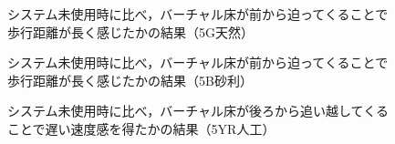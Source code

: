 \begin{figure}[H]
    \centering
    \caption{システム未使用時に比べ，バーチャル床が前から迫ってくることで歩行距離が長く感じたかの結果（5G天然）}
    \label{fig:fl5G}
\end{figure}

\begin{figure}[H]
    \centering
    \caption{システム未使用時に比べ，バーチャル床が前から迫ってくることで歩行距離が長く感じたかの結果（5B砂利）}
    \label{fig:fl5B}
\end{figure}

\begin{figure}[H]
    \centering
    \caption{システム未使用時に比べ，バーチャル床が後ろから追い越してくることで遅い速度感を得たかの結果（5YR人工）}
    \label{fig:bs5YR}
\end{figure}

